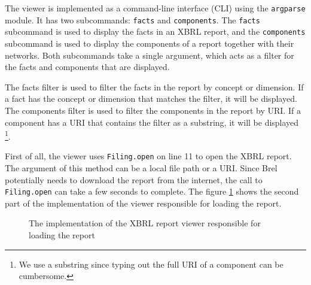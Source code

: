 The viewer is implemented as a command-line interface (CLI) using the \texttt{argparse} module.
It has two subcommands: \texttt{facts} and \texttt{components}.
The \texttt{facts} subcommand is used to display the facts in an XBRL report, and the \texttt{components} subcommand is used to display the components of a report together with their networks.
Both subcommands take a single argument, which acts as a filter for the facts and components that are displayed.

The facts filter is used to filter the facts in the report by concept or dimension.
If a fact has the concept or dimension that matches the filter, it will be displayed.
The components filter is used to filter the components in the report by URI.
If a component has a URI that contains the filter as a substring, it will be displayed
\footnote{We use a substring since typing out the full URI of a component can be cumbersome.}.

First of all, the viewer uses \texttt{Filing.open} on line 11 to open the XBRL report.
The argument of this method can be a local file path or a URI.
Since Brel potentially needs to download the report from the internet, the call to \texttt{Filing.open} can take a few seconds to complete.
The figure \ref{fig:viewer_2} shows the second part of the implementation of the viewer responsible for loading the report.

\begin{figure}[H]
    \centering
    \caption{The implementation of the XBRL report viewer responsible for loading the report}
    
    \label{fig:viewer_2}
\end{figure}

